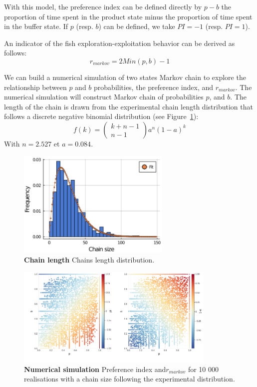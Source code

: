   With this model, the preference index can be defined directly by $p-b$ the proportion of time spent in the product state minus the proportion of time spent in the buffer state. If $p$ (resp. $b$) can be defined, we take $PI=-1$ (resp. $PI=1$).

 An indicator of the fish exploration-exploitation behavior can be derived as follows:
$$ r_{markov} = 2Min(p,b) - 1 $$

  We can build a numerical simulation of two states Markov chain to explore the relationship between $p$ and $b$ probabilities, the preference index, and $r_{markov}$. The numerical simulation will construct Markov chain of probabilities $p$, and $b$. The length of the chain is drawn from the experimental chain length distribution that follows a discrete negative binomial distribution (see Figure~\ref{chain_fit}):
  $$
  f(k) = \begin{pmatrix}
  k+n-1\\
  n-1
  \end{pmatrix}
  a^n(1-a)^k
  $$
  \noindent With $n=2.527$ et $a=0.084$.

  \begin{figure}[h]
    \centering
    \includegraphics[width=0.65\textwidth]{part_2/assets/chain_fit.png}
    \caption{\textbf{Chain length} Chains length distribution.}
    \label{chain_fit}
  \end{figure}

  \begin{figure}[h]
    \centering
    \includegraphics[width=0.85\textwidth]{part_2/assets/pi_pb.png}
    \caption{\textbf{Numerical simulation} Preference index and$r_{markov}$ for 10 000 realisations with a chain size following the experimental distribution.}
    \label{markov_simu}
  \end{figure}

